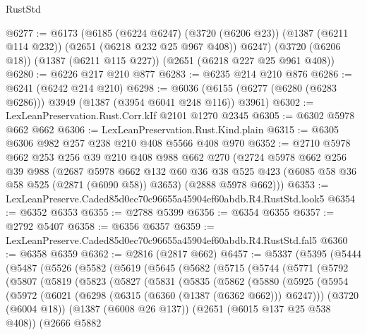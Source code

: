 \begin{lexlean}{RustStd}
\begin{coremodule}
@6277 := @6173
    (@6185
      (@6224 @6247)
      (@3720 (@6206 @23))
      (@1387 (@6211 @114 @232))
      (@2651 (@6218 @232 @25 @967 @408))
      @6247)
    (@3720 (@6206 @18))
    (@1387 (@6211 @115 @227))
    (@2651 (@6218 @227 @25 @961 @408))
@6280 := @6226 @217 @210 @877
@6283 := @6235 @214 @210 @876
@6286 := @6241 (@6242 @214 @210)
@6298 := @6036 (@6155 (@6277 (@6280 (@6283 @6286))) @3949 (@1387 (@3954 @6041 @248 @116)) @3961)
@6302 := LexLeanPreservation.Rust.Corr.kIf @2101 @1270 @2345
@6305 := @6302 @5978 @662 @662
@6306 := LexLeanPreservation.Rust.Kind.plain
@6315 := @6305 @6306 @982 @257 @238 @210 @408 @5566 @408 @970
@6352 := @2710
    @5978
    @662
    @253
    @256
    @39
    @210
    @408
    @988
    @662
    @270
    (@2724
      @5978
      @662
      @256
      @39
      @988
      (@2687
        @5978
        @662
        @132
        @60
        @36
        @38
        @525
        @423
        (@6085 @58 @36 @58 @525 (@2871 (@6090 @58)) @3653)
        (@2888 @5978 @662)))
@6353 := LexLeanPreserve.Caded85d0ec70c96655a45904ef60abdb.R4.RustStd.look5
@6354 := @6352 @6353
@6355 := @2788 @5399
@6356 := @6354 @6355
@6357 := @2792 @5407
@6358 := @6356 @6357
@6359 := LexLeanPreserve.Caded85d0ec70c96655a45904ef60abdb.R4.RustStd.fal5
@6360 := @6358 @6359
@6362 := @2816 (@2817 @662)
@6457 := @5337
    (@5395
      (@5444
        (@5487
          (@5526
            (@5582
              (@5619
                (@5645
                  (@5682
                    (@5715
                      (@5744
                        (@5771
                          (@5792
                            (@5807
                              (@5819
                                (@5823
                                  (@5827
                                    (@5831
                                      (@5835
                                        (@5862
                                          (@5880
                                            (@5925
                                              (@5954
                                                (@5972
                                                  (@6021
                                                    (@6298
                                                      (@6315 (@6360 (@1387 (@6362 @662))) @6247)))
                                                  (@3720 (@6004 @18))
                                                  (@1387 (@6008 @26 @137))
                                                  (@2651 (@6015 @137 @25 @538 @408))
                                                  (@2666
                                                    @5882

\end{coremodule}
\end{lexlean}
